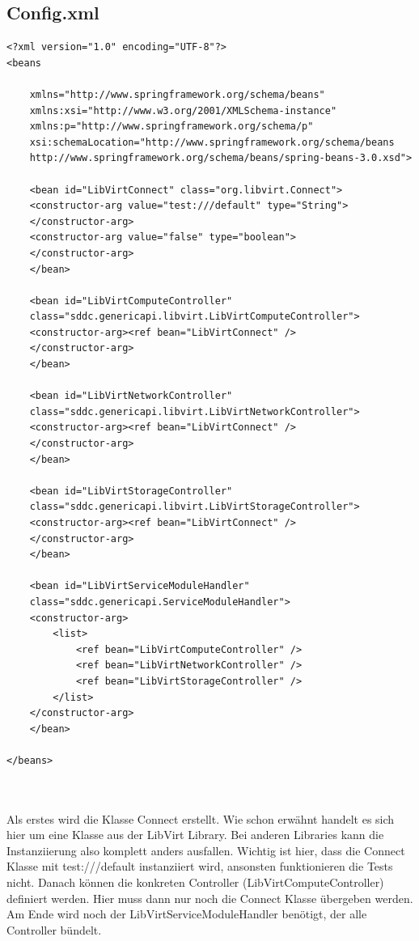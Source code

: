\documentclass[11pt]{scrartcl}
\begin{document}
\subsection{Config.xml}
\begin{lstlisting}[frame=single]
<?xml version="1.0" encoding="UTF-8"?>  
<beans  

    xmlns="http://www.springframework.org/schema/beans"  
    xmlns:xsi="http://www.w3.org/2001/XMLSchema-instance"  
    xmlns:p="http://www.springframework.org/schema/p"  
    xsi:schemaLocation="http://www.springframework.org/schema/beans  
    http://www.springframework.org/schema/beans/spring-beans-3.0.xsd">

	<bean id="LibVirtConnect" class="org.libvirt.Connect">
	<constructor-arg value="test:///default" type="String">
	</constructor-arg>
	<constructor-arg value="false" type="boolean">
	</constructor-arg>
	</bean>

	<bean id="LibVirtComputeController" 
	class="sddc.genericapi.libvirt.LibVirtComputeController">
	<constructor-arg><ref bean="LibVirtConnect" />
	</constructor-arg>
	</bean>
	
	<bean id="LibVirtNetworkController" 
	class="sddc.genericapi.libvirt.LibVirtNetworkController">
	<constructor-arg><ref bean="LibVirtConnect" />
	</constructor-arg>
	</bean>
	
	<bean id="LibVirtStorageController" 
	class="sddc.genericapi.libvirt.LibVirtStorageController">
	<constructor-arg><ref bean="LibVirtConnect" />
	</constructor-arg>
	</bean>
	
	<bean id="LibVirtServiceModuleHandler" 
	class="sddc.genericapi.ServiceModuleHandler">
	<constructor-arg>
		<list>
			<ref bean="LibVirtComputeController" />
			<ref bean="LibVirtNetworkController" />
			<ref bean="LibVirtStorageController" />
		</list>
	</constructor-arg>
	</bean>
	             
</beans>



\end{lstlisting}
Als erstes wird die Klasse Connect erstellt. Wie schon erwähnt handelt es sich hier um eine Klasse aus der LibVirt Library. Bei anderen Libraries kann die Instanziierung also komplett anders ausfallen. Wichtig ist hier, dass die Connect Klasse mit test:///default instanziiert wird, ansonsten funktionieren die Tests nicht. Danach können die konkreten Controller (LibVirtComputeController) definiert werden. Hier muss dann nur noch die Connect Klasse übergeben werden. Am Ende wird noch der LibVirtServiceModuleHandler benötigt, der alle Controller bündelt.\\
\end{document}
